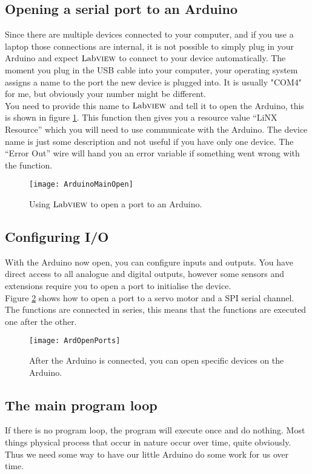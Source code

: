 \subsection{Opening a serial port to an Arduino}
Since there are multiple devices connected to your computer, and if you use a laptop those connections are internal, it is not possible to simply plug in your Arduino and expect $\text{Lab}\textsc{view}$ to connect to your device automatically. The moment you plug in the USB cable into your computer, your operating system assigns a name to the port the new device is plugged into. It is usually "COM4" for me, but obviously your number might be different.\\

You need to provide this name to $\text{Lab}\textsc{view}$ and tell it to open the Arduino, this is shown in figure \ref{OpenPort}. This function then gives you a resource value ``LiNX Resource''  which you will need to use communicate with the Arduino. The device name is just some description and not useful if you have only one device. The ``Error Out'' wire will hand you an error variable if something went wrong with the function.\\
\begin{figure}
	\centering
	\texttt{[image: ArduinoMainOpen]}
	\caption{Using $\text{Lab}\textsc{view}$ to open a port to an Arduino.}
	\label{OpenPort}
\end{figure}
\subsection{Configuring I/O}
With the Arduino now open, you can configure inputs and outputs. You have direct access to all analogue and digital outputs, however some sensors and extensions require you to open a port to initialise the device.\\

Figure \ref{OpenPorts} shows how to open a port to a servo motor and a SPI serial channel. The functions are connected in series, this means that the functions are executed one after the other.\\
\begin{figure}
	\centering
	\texttt{[image: ArdOpenPorts]}
	\caption{After the Arduino is connected, you can open specific devices on the Arduino.}
	\label{OpenPorts}
\end{figure}
\subsection{The main program loop} 
If there is no program loop, the program will execute once and do nothing. Most things physical process that occur in nature occur over time, quite obviously. Thus we need some way to have our little Arduino do some work for us over time.\\

